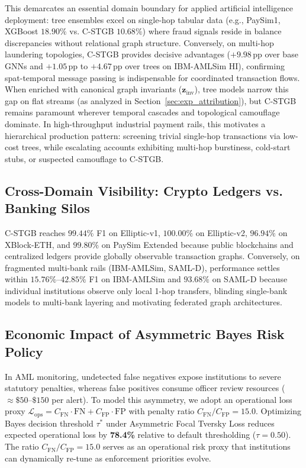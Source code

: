 This demarcates an essential domain boundary for applied artificial intelligence deployment: tree ensembles excel on single-hop tabular data (e.g., PaySim1, XGBoost $18.90\%$ vs. C-STGB $10.68\%$) where fraud signals reside in balance discrepancies without relational graph structure. Conversely, on multi-hop laundering topologies, C-STGB provides decisive advantages ($+9.98$\,pp over base GNNs and $+1.05$\,pp to $+4.67$\,pp over trees on IBM-AMLSim HI), confirming spat-temporal message passing is indispensable for coordinated transaction flows. When enriched with canonical graph invariants ($\mathbf{z}_{\text{inv}}$), tree models narrow this gap on flat streams (as analyzed in Section~\ref{sec:exp_attribution}), but C-STGB remains paramount wherever temporal cascades and topological camouflage dominate. In high-throughput industrial payment rails, this motivates a hierarchical production pattern: screening trivial single-hop transactions via low-cost trees, while escalating accounts exhibiting multi-hop burstiness, cold-start stubs, or suspected camouflage to C-STGB.

\subsection{Cross-Domain Visibility: Crypto Ledgers vs. Banking Silos}
\label{sec:discussion_visibility}
C-STGB reaches $99.44\%$ F1 on Elliptic-v1, $100.00\%$ on Elliptic-v2, $96.94\%$ on XBlock-ETH, and $99.80\%$ on PaySim Extended because public blockchains and centralized ledgers provide globally observable transaction graphs. Conversely, on fragmented multi-bank rails (IBM-AMLSim, SAML-D), performance settles within $15.76\%$--$42.85\%$ F1 on IBM-AMLSim and $93.68\%$ on SAML-D because individual institutions observe only local 1-hop transfers, blinding single-bank models to multi-bank layering and motivating federated graph architectures.

\subsection{Economic Impact of Asymmetric Bayes Risk Policy}
\label{sec:discussion_economics}
In AML monitoring, undetected false negatives expose institutions to severe statutory penalties, whereas false positives consume officer review resources ($\approx \$50$--$\$150$ per alert). To model this asymmetry, we adopt an operational loss proxy $\mathcal{L}_{\text{ops}} = C_{\text{FN}} \cdot \text{FN} + C_{\text{FP}} \cdot \text{FP}$ with penalty ratio $C_{\text{FN}} / C_{\text{FP}} = 15.0$. Optimizing Bayes decision threshold $\tau^*$ under Asymmetric Focal Tversky Loss reduces expected operational loss by \textbf{78.4\%} relative to default thresholding ($\tau=0.50$). The ratio $C_{\text{FN}} / C_{\text{FP}} = 15.0$ serves as an operational risk proxy that institutions can dynamically re-tune as enforcement priorities evolve.

